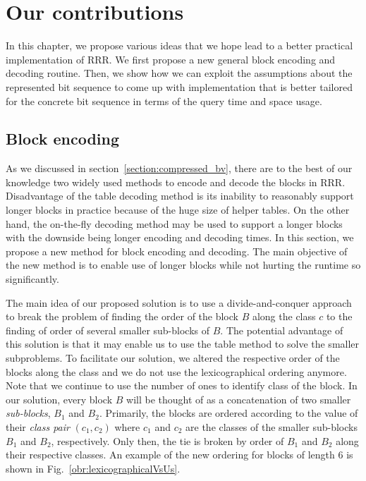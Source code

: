 \chapter{Our contributions}
\label{kap:kap3}


In this chapter, we propose various ideas that we hope lead to a better practical
implementation of RRR. We first propose a new general block encoding and decoding routine.
Then, we show how we can exploit the assumptions about the represented bit sequence to
come up with implementation that is better tailored for the concrete bit sequence in terms of
the query time and space usage.

\section{Block encoding}

As we discussed in section~\ref{section:compressed_bv}, there are to
the best of our knowledge two widely used methods to encode and decode the
blocks in RRR. Disadvantage of the table decoding method is its inability
to reasonably support longer blocks in practice because of the huge size of
helper tables. On the other hand, the on-the-fly decoding method may be used
to support a longer blocks with the downside being longer encoding and decoding
times. In this section, we propose a new method for block encoding and decoding.
The main objective of the new method is to enable use of longer blocks while not
hurting the runtime so significantly.

The main idea of our proposed solution is to use a divide-and-conquer approach to
break the problem of finding the order of the block $B$ along the class $c$ to
the finding of order of several smaller sub-blocks of $B$. The potential advantage of this
solution is that it may enable us to use the table method to solve the smaller
subproblems. To facilitate our solution, we altered the respective order of the blocks
along the class and we do not use the lexicographical ordering anymore. Note that we
continue to use the number of ones to identify class of the block. In our solution, every
block $B$ will be thought of as a concatenation of two smaller \textit{sub-blocks}, $B_1$
and $B_2$. Primarily, the blocks are ordered according to the value of their \textit{class pair}
$(c_1, c_2)$ where $c_1$ and $c_2$ are the classes of the smaller sub-blocks $B_1$ and $B_2$,
respectively. Only then, the tie is broken by order of $B_1$ and $B_2$ along their respective
classes. An example of the new ordering for blocks of length 6 is shown in Fig.~\ref{obr:lexicographicalVsUs}.

